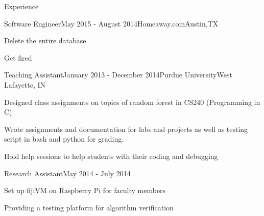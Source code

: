 \documentclass{resume} %
\begin{document}
\begin{rSection}{Experience}

\begin{rSubsection}{Software Engineer}{May 2015 - August 2014}{Homeaway.com}{Austin,TX}
\item Delete the entire database
\item Get fired
\end{rSubsection}

\begin{rSubsection}{Teaching Assistant}{January 2013 - December 2014}{Purdue University}{West Lafayette, IN}
\item Designed class assignments on topics of random forest in CS240 (Programming in C)
\item Wrote assignments and documentation for labs and projects as well as testing script in bash and python for grading.
\item Hold help sessions to help students with their coding and debugging
\end{rSubsection}

\begin{rSubsection}{Research Assistant}{May 2014 - July 2014}{}{}
\item Set up fijiVM on Raspberry Pi for faculty members
\item Providing a testing platform for algorithm verification 
\end{rSubsection}

\end{rSection}


\end{document}
